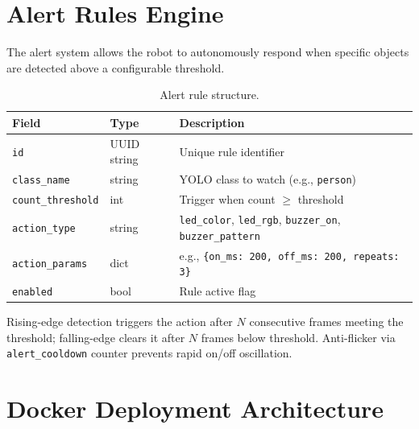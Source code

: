 \documentclass[12pt,a4paper]{article}
\begin{document}
\section{Alert Rules Engine}

The alert system allows the robot to autonomously respond when specific objects
are detected above a configurable threshold.

\begin{table}[H]
\centering
\caption{Alert rule structure.}
\label{tab:alert}
\begin{tabular}{@{}lll@{}}
\toprule
\textbf{Field}       & \textbf{Type}   & \textbf{Description} \\
\midrule
\texttt{id}           & UUID string  & Unique rule identifier \\
\texttt{class\_name}  & string       & YOLO class to watch (e.g., \texttt{person}) \\
\texttt{count\_threshold} & int      & Trigger when count $\ge$ threshold \\
\texttt{action\_type} & string       & \texttt{led\_color}, \texttt{led\_rgb}, \texttt{buzzer\_on}, \texttt{buzzer\_pattern} \\
\texttt{action\_params} & dict       & e.g., \texttt{\{on\_ms: 200, off\_ms: 200, repeats: 3\}} \\
\texttt{enabled}      & bool         & Rule active flag \\
\bottomrule
\end{tabular}
\end{table}

Rising-edge detection triggers the action after $N$ consecutive frames meeting
the threshold; falling-edge clears it after $N$ frames below threshold.
Anti-flicker via \texttt{alert\_cooldown} counter prevents rapid on/off
oscillation.

\section{Docker Deployment Architecture}
\end{document}
